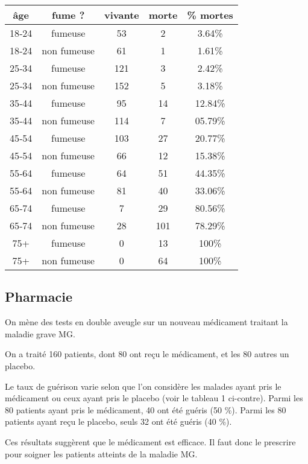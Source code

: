 \documentclass[10pt,dvipsnames, dvips, svgnames]{article}
\begin{document}
\begin{center}
\begin{tabular}[]{|c |c |c |c |c |}
\hline âge & fume ? & vivante & morte &  \% mortes \\
\hline \hline 18‐24 & fumeuse & 53 & 2 & 3.64\% \\
\hline 18‐24 & non  fumeuse & 61 & 1 & 1.61\% \\
\hline 25‐34 & fumeuse & 121 & 3 & 2.42\% \\
\hline 25‐34 & non  fumeuse & 152 & 5 & 3.18\% \\
\hline 35‐44 & fumeuse & 95 & 14 & 12.84\% \\
\hline 35‐44 & non  fumeuse & 114 & 7 & 05.79\% \\
\hline 45‐54 & fumeuse & 103 & 27 & 20.77\% \\
\hline 45‐54 & non  fumeuse & 66 & 12 & 15.38\% \\
\hline 55‐64 & fumeuse & 64 & 51 & 44.35\% \\
\hline 55‐64 & non  fumeuse & 81 & 40 & 33.06\% \\
\hline 65‐74 & fumeuse & 7 & 29 & 80.56\% \\
\hline 65‐74 & non  fumeuse & 28 & 101 & 78.29\% \\
\hline 75+ & fumeuse & 0 & 13 & 100\% \\
\hline 75+ & non  fumeuse & 0 & 64 & 100\% \\
\hline 
\end{tabular} 
\end{center}


\subsection{Pharmacie}



On mène des tests en double aveugle sur un nouveau médicament traitant la maladie grave MG.

On a traité 160 patients, dont 80 ont reçu le médicament, et les 80 autres un placebo.

Le taux de guérison varie selon que l'on considère les malades ayant pris le médicament ou ceux ayant pris le placebo (voir le tableau 1 ci-contre). Parmi les 80 patients ayant pris le médicament, 40 ont été guéris (50 \%). Parmi les 80 patients ayant reçu le placebo, seuls 32 ont été guéris (40 \%).

Ces résultats suggèrent que le médicament est efficace. Il faut donc le prescrire pour soigner les patients atteints de la maladie MG.
\end{document}
